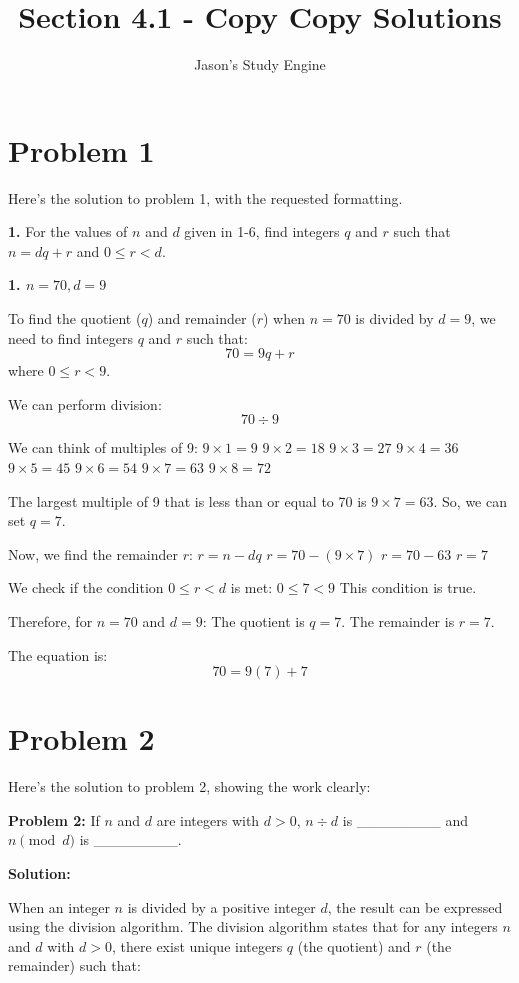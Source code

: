 \documentclass{article}
\begin{document}
\title{\textbf{Section 4.1 - Copy Copy Solutions}}
\author{Jason's Study Engine}\n\maketitle
\section*{\textbf{Problem 1}}
Here's the solution to problem 1, with the requested formatting.

\textbf{1.} For the values of $n$ and $d$ given in 1-6, find integers $q$ and $r$ such that $n = dq + r$ and $0 \le r < d$.

\textbf{1. $n = 70, d = 9$}

To find the quotient ($q$) and remainder ($r$) when $n=70$ is divided by $d=9$, we need to find integers $q$ and $r$ such that:
$$70 = 9q + r$$
where $0 \le r < 9$.

We can perform division:
$$70 \div 9$$

We can think of multiples of 9:
$9 \times 1 = 9$
$9 \times 2 = 18$
$9 \times 3 = 27$
$9 \times 4 = 36$
$9 \times 5 = 45$
$9 \times 6 = 54$
$9 \times 7 = 63$
$9 \times 8 = 72$

The largest multiple of 9 that is less than or equal to 70 is $9 \times 7 = 63$.
So, we can set $q = 7$.

Now, we find the remainder $r$:
$r = n - dq$
$r = 70 - (9 \times 7)$
$r = 70 - 63$
$r = 7$

We check if the condition $0 \le r < d$ is met:
$0 \le 7 < 9$
This condition is true.

Therefore, for $n=70$ and $d=9$:
The quotient is $q = 7$.
The remainder is $r = 7$.

The equation is:
$$70 = 9(7) + 7$$

\newpage

\section*{\textbf{Problem 2}}
Here's the solution to problem 2, showing the work clearly:

\textbf{Problem 2:}
If $n$ and $d$ are integers with $d > 0$, $n \div d$ is \_\_\_\_\_\_\_\_ and $n \pmod{d}$ is \_\_\_\_\_\_\_\_.

\textbf{Solution:}

When an integer $n$ is divided by a positive integer $d$, the result can be expressed using the division algorithm. The division algorithm states that for any integers $n$ and $d$ with $d > 0$, there exist unique integers $q$ (the quotient) and $r$ (the remainder) such that:
\end{document}
